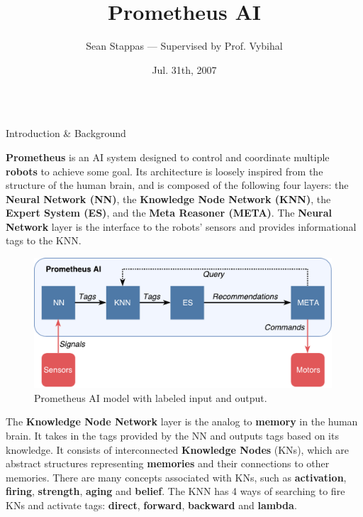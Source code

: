 \documentclass[final]{beamer} %
\title[Fancy Posters]{Prometheus AI}
\author{Sean Stappas --- Supervised by Prof. Vybihal}
\institute[RWTH Aachen University]{}
\date{Jul. 31th, 2007}
\newlength{\columnheight}
\begin{document}
	\begin{frame}
		\begin{columns}
			\begin{column}{.33\textwidth}
				\parbox[t][\columnheight]{\textwidth}{
				\begin{block}{Introduction \& Background}
					\parbox{0.99\textwidth}{
						\textbf{Prometheus} is an AI system designed to control and coordinate multiple \textbf{robots} to achieve some goal. Its architecture is loosely inspired from the structure of the human brain, and is composed of the following four layers: the \textbf{Neural Network (NN)}, the \textbf{Knowledge Node Network (KNN)}, the \textbf{Expert System (ES)}, and the \textbf{Meta Reasoner (META)}. The \textbf{Neural Network} layer is the interface to the robots' sensors and provides informational tags to the KNN.}
				
					\begin{figure}[!htb]
						\includegraphics[width=0.99\textwidth]{figures/ai_model_labeled.pdf}
						\caption{Prometheus AI model with labeled input and output.}
						\label{model_labeled}
					\end{figure}
				
					\parbox{0.99\textwidth}{The \textbf{Knowledge Node Network} layer is the analog to \textbf{memory} in the human brain. It takes in the tags provided by the NN and outputs tags based on its knowledge. It consists of interconnected \textbf{Knowledge Nodes} (KNs), which are abstract structures representing \textbf{memories} and their connections to other memories. There are many concepts associated with KNs, such as \textbf{activation}, \textbf{firing}, \textbf{strength}, \textbf{aging} and \textbf{belief}. The KNN has 4 ways of searching to fire KNs and activate tags: \textbf{direct}, \textbf{forward}, \textbf{backward} and \textbf{lambda}.}
					

\end{block}}
\end{column}
\end{columns}
\end{frame}
\end{document}

